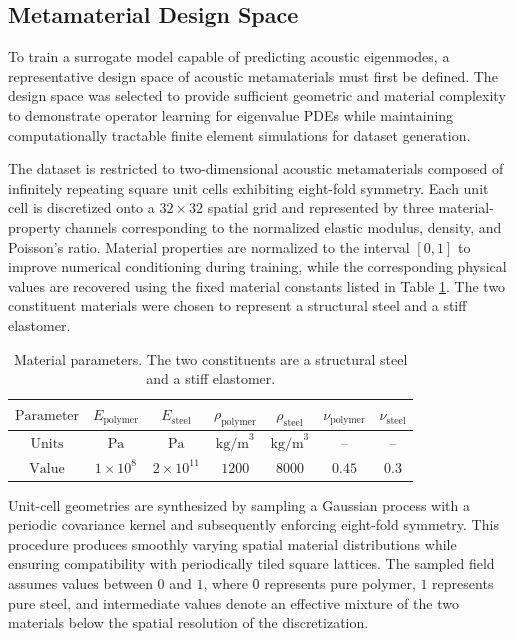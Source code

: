\documentclass[preprint,review,12pt,numafflabel]{elsarticle}
\begin{document}

\subsection{Metamaterial Design Space}
\label{ssec:metamaterial_design_space}
To train a surrogate model capable of predicting acoustic eigenmodes, a representative design space of acoustic metamaterials must first be defined. The design space was selected to provide sufficient geometric and material complexity to demonstrate operator learning for eigenvalue PDEs while maintaining computationally tractable finite element simulations for dataset generation.

The dataset is restricted to two-dimensional acoustic metamaterials composed of infinitely repeating square unit cells exhibiting eight-fold symmetry. Each unit cell is discretized onto a $32\times32$ spatial grid and represented by three material-property channels corresponding to the normalized elastic modulus, density, and Poisson's ratio. Material properties are normalized to the interval $[0,1]$ to improve numerical conditioning during training, while the corresponding physical values are recovered using the fixed material constants listed in Table \ref{tab:parameter_ranges}. The two constituent materials were chosen to represent a structural steel and a stiff elastomer.

\begin{table}[h]
  \centering
  \begin{tabular}{|c|c|c|c|c|c|c|}
    \hline
    $\text{Parameter}$ & $E_{\text{polymer}}$ & $E_{\text{steel}}$ & $\rho_{\text{polymer}}$ & $\rho_{\text{steel}}$ & $\nu_{\text{polymer}}$ & $\nu_{\text{steel}}$ \\
    \hline
    $\text{Units}$ & $\text{Pa}$ & $\text{Pa}$ & $\text{kg/m}^3$ & $\text{kg/m}^3$ & -- & -- \\
    \hline
    $\text{Value}$ & $1 \times 10^{8}$ & $2 \times 10^{11}$ & $1200$ & $8000$ & $0.45$ & $0.3$ \\
    \hline
  \end{tabular}
  \caption{Material parameters. The two constituents are a structural steel and a stiff elastomer.}
  \label{tab:parameter_ranges}
\end{table}

Unit-cell geometries are synthesized by sampling a Gaussian process with a periodic covariance kernel and subsequently enforcing eight-fold symmetry. This procedure produces smoothly varying spatial material distributions while ensuring compatibility with periodically tiled square lattices. The sampled field assumes values between $0$ and $1$, where $0$ represents pure polymer, $1$ represents pure steel, and intermediate values denote an effective mixture of the two materials below the spatial resolution of the discretization.
\end{document}
